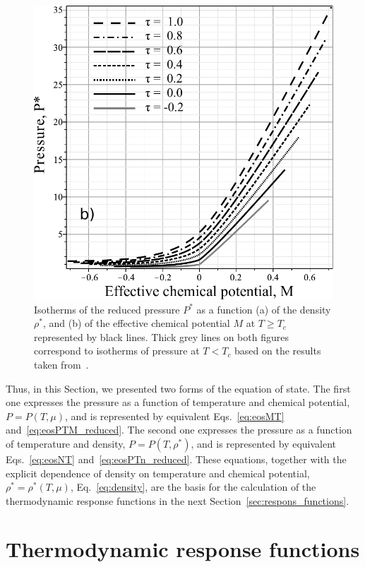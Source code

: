 \documentclass[fleqn,twoside,twocolumn,nofootinbib,showkeys]{revtex4} %
\begin{document}
\begin{figure}[h!]
		\includegraphics[width=\column]{f1b1.pdf}
		\vskip-3mm
		\caption{Isotherms of the reduced pressure $P^*$ as a function (a) of the density $\rho^*$, and (b) of the effective chemical potential $M$ at $T \geq T_c$ represented by black lines. Thick grey lines on both figures correspond to isotherms of pressure at $T < T_c$ based on the results taken from~\cite{KozlovskiiDobush2020}.
		}
		\label{fig1}
	\end{figure}
	
	Thus, in this Section, we presented two forms of the equation of state. The first one expresses the pressure as a function of temperature and chemical potential, $P = P(T, \mu)$, and is represented by equivalent Eqs.~\eqref{eq:eosMT} and~\eqref{eq:eosPTM_reduced}. The second one expresses the pressure as a function of temperature and density, $P = P(T, \rho^*)$, and is represented by equivalent Eqs.~\eqref{eq:eosNT} and~\eqref{eq:eosPTn_reduced}. These equations, together with the explicit dependence of density on temperature and chemical potential, $\rho^* = \rho^*(T, \mu)$, Eq.~\eqref{eq:density}, are the basis for the calculation of the thermodynamic response functions in the next Section~\ref{sec:respons_functions}. 
	
	\section{\label{sec:respons_functions}Thermodynamic response functions}
	
\end{document}
